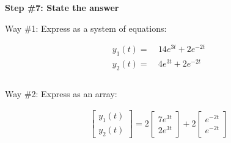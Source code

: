 \documentclass{package/notes}
\begin{document}
\textbf{Step \#7: State the answer}

Way \#1: Express as a system of equations:

\begin{equation*}
	\begin{aligned}
		y_1(t) =&\: 14e^{3t} + 2e^{-2t}\\
		y_2(t) = &\: 4e^{3t} + 2e^{-2t}\\
	\end{aligned}
\end{equation*}\\

Way \#2: Express as an array:

\begin{equation*}
	\begin{aligned}
		\left[\begin{array}{c} y_1(t) \\ y_2(t) \end{array}\right] 
		= 2\left[\begin{array}{c} 7e^{3t} \\ 2e^{3t}\end{array}\right] 
		+ 2\left[\begin{array}{c} e^{-2t}\\e^{-2t}\end{array}\right]
	\end{aligned}
\end{equation*}
\end{document}
